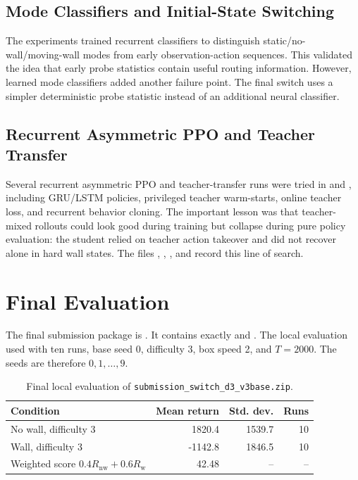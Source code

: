 \documentclass[11pt]{article}
\begin{document}
\subsection{Mode Classifiers and Initial-State Switching}

The  experiments trained recurrent classifiers to distinguish
static/no-wall/moving-wall modes from early observation-action sequences.  This
validated the idea that early probe statistics contain useful routing information.
However, learned mode classifiers added another failure point.  The final switch uses
a simpler deterministic probe statistic instead of an additional neural classifier.

\subsection{Recurrent Asymmetric PPO and Teacher Transfer}

Several recurrent asymmetric PPO and teacher-transfer runs were tried in
 and , including GRU/LSTM policies, privileged
teacher warm-starts, online teacher loss, and recurrent behavior cloning.  The
important lesson was that teacher-mixed rollouts could look good during training but
collapse during pure policy evaluation: the student relied on teacher action takeover
and did not recover alone in hard wall states.  The files
,
,
, and
 record this line of search.

\section{Final Evaluation}

The final submission package is
.
It contains exactly  and .
The local evaluation used  with ten runs, base seed 0, difficulty 3,
box speed 2, and \(T=2000\).  The seeds are therefore \(0,1,\ldots,9\).

\begin{table}[h]
\centering
\begin{tabular}{lrrr}
\toprule
Condition & Mean return & Std. dev. & Runs \\
\midrule
No wall, difficulty 3 & 1820.4 & 1539.7 & 10 \\
Wall, difficulty 3 & -1142.8 & 1846.5 & 10 \\
\midrule
Weighted score \(0.4R_{\text{nw}}+0.6R_{\text{w}}\) & 42.48 & -- & -- \\
\bottomrule
\end{tabular}
\caption{Final local evaluation of \texttt{submission\_switch\_d3\_v3base.zip}.}
\end{table}
\end{document}
